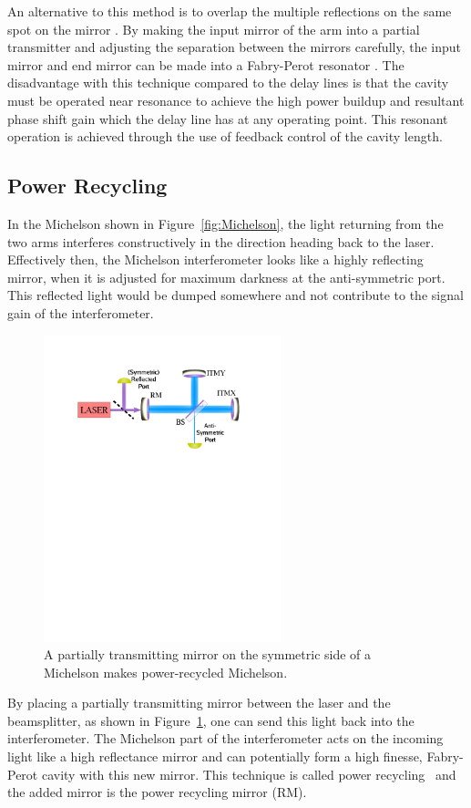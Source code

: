 An alternative to this method is to overlap the multiple reflections on 
the same spot on the mirror \cite{Drever:Houches}. By making the
input mirror of the arm into a partial transmitter and adjusting the separation
between the mirrors carefully, the input mirror and end mirror can be made into a
Fabry-Perot resonator \cite{FabryPerot}. The disadvantage with this technique
compared to the delay lines is that the cavity must be operated near resonance
to achieve the high power buildup and resultant phase shift gain which the
delay line has at any operating point. This resonant operation is achieved through
the use of feedback control of the cavity length.




\subsection{Power Recycling}

In the Michelson shown in Figure~\ref{fig:Michelson}, the light returning from
the two arms interferes constructively in the direction heading back to the laser.
Effectively then, the Michelson interferometer looks like a highly reflecting
mirror, when it is adjusted for maximum darkness at the anti-symmetric port.
This reflected light would be dumped somewhere and not contribute to the signal
gain of the interferometer. 

\begin{figure}[!h]
\centerline{\includegraphics[angle=0,height=3.5in]{Figures/Chap2/PRM.pdf}}
\caption[PRM Diagram]{A partially transmitting mirror on the symmetric side
         of a Michelson makes power-recycled Michelson.}
\label{fig:PRM}
\end{figure}
By placing a partially transmitting mirror between the laser and the beamsplitter,
as shown in Figure~\ref{fig:PRM}, one can send this light back into 
the interferometer. The Michelson part of the
interferometer acts on the incoming light like a high reflectance mirror and
can potentially form a high finesse, Fabry-Perot cavity with this new mirror.
This technique is called power 
recycling~\cite{Peter:Thesis,Schilling:Recycling,Drever:Houches} 
and the added mirror is the power recycling mirror (RM).

